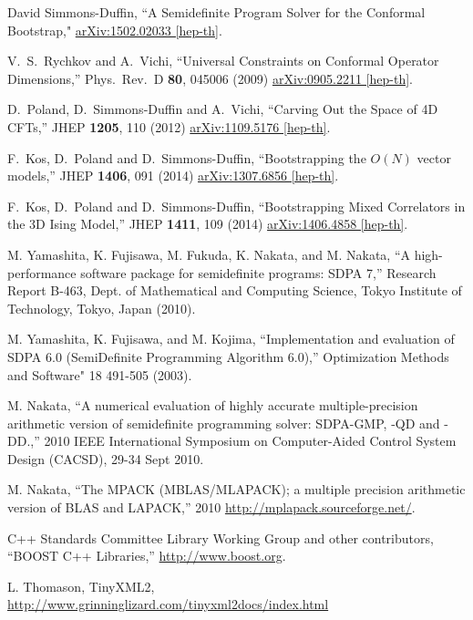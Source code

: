 \documentclass[12pt]{article}
\numberwithin{equation}{section}
\begin{document}
\begin{thebibliography}{9}

  David Simmons-Duffin,
  ``A Semidefinite Program Solver for the Conformal Bootstrap,"
  \href{http://arxiv.org/abs/1502.02033}{arXiv:1502.02033 [hep-th]}.

  V.~S.~Rychkov and A.~Vichi,
  ``Universal Constraints on Conformal Operator Dimensions,''
  Phys.\ Rev.\ D {\bf 80}, 045006 (2009)
  \href{http://arxiv.org/abs/0905.2211}{arXiv:0905.2211 [hep-th]}.

  D.~Poland, D.~Simmons-Duffin and A.~Vichi,
  ``Carving Out the Space of 4D CFTs,''
  JHEP {\bf 1205}, 110 (2012)
  \href{http://arXiv.org/abs/1109.5176}{arXiv:1109.5176 [hep-th]}.
  
  F.~Kos, D.~Poland and D.~Simmons-Duffin,
  ``Bootstrapping the $O(N)$ vector models,''
  JHEP {\bf 1406}, 091 (2014)
  \href{http://arXiv.org/abs/1307.6856}{arXiv:1307.6856 [hep-th]}.

  F.~Kos, D.~Poland and D.~Simmons-Duffin,
  ``Bootstrapping Mixed Correlators in the 3D Ising Model,''
  JHEP {\bf 1411}, 109 (2014)
  \href{http://arXiv.org/abs/1406.4858}{arXiv:1406.4858 [hep-th]}.

  M. Yamashita, K. Fujisawa, M. Fukuda, K. Nakata, and M. Nakata,
  ``A high-performance software package for semidefinite programs: SDPA 7,''
   Research Report B-463, Dept. of Mathematical and Computing Science, Tokyo Institute of Technology, Tokyo, Japan (2010).

  M. Yamashita, K. Fujisawa, and M. Kojima,
  ``Implementation and evaluation of SDPA 6.0 (SemiDefinite Programming Algorithm 6.0),''
  Optimization Methods and Software" 18 491-505 (2003).

  M. Nakata,
  ``A numerical evaluation of highly accurate multiple-precision arithmetic version of semidefinite programming solver: SDPA-GMP, -QD and -DD.,''
  2010 IEEE International Symposium on Computer-Aided Control System Design (CACSD), 29-34 Sept 2010.

  M. Nakata,
  ``The MPACK (MBLAS/MLAPACK); a multiple precision arithmetic version of BLAS and LAPACK,''
  2010
  \href{http://mplapack.sourceforge.net/}{http://mplapack.sourceforge.net/}.

  C++ Standards Committee Library Working Group and other contributors,
  ``BOOST C++ Libraries,''
  \href{http://www.boost.org}{http://www.boost.org}.

  L. Thomason,
  TinyXML2,
  \href{http://www.grinninglizard.com/tinyxml2docs/index.html}{http://www.grinninglizard.com/tinyxml2docs/index.html}

\end{thebibliography}
\end{document}
